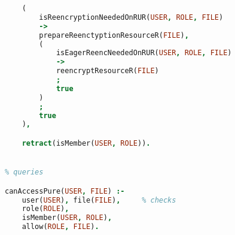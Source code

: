 \begin{lstlisting}[language=Prolog]
    % files
    (
        isReencryptionNeededOnRUR(USER, ROLE, FILE)
        ->
        prepareReenctyptionResourceR(FILE),
        (
            isEagerReencNeededOnRUR(USER, ROLE, FILE)
            ->
            reencryptResourceR(FILE)
            ;
            true
        )
        ;
        true
    ),

    retract(isMember(USER, ROLE)).


% queries

canAccessPure(USER, FILE) :-
    user(USER), file(FILE),     % checks
    role(ROLE),
    isMember(USER, ROLE),
    allow(ROLE, FILE).
\end{lstlisting}
